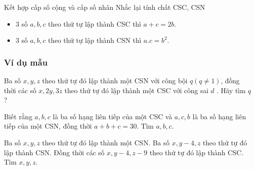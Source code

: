 \begin{dang}{Kết hợp cấp số cộng và cấp số nhân}
	Nhắc lại tính chất CSC, CSN
	\begin{itemize}
		\item $3$ số $a,b,c$ theo thứ tự lập thành CSC thì $a+c=2b$.
		\item $3$ số $a,b,c$ theo thứ tự lập thành CSN thì $a.c=b^2$.
	\end{itemize}
\end{dang}
\subsubsection{Ví dụ mẫu}
\begin{vd}[TH]%
	Ba số $x, y, z$ theo thứ tự đó lập thành một CSN với công bội $q (q\ne 1)$, đồng thời các số $x, 2y, 3z$ theo thứ tự đó lập thành một CSC với công sai $d$ . Hãy tìm $q$?
\end{vd}

\begin{vd}[TH]%
	Biết rằng $a, b, c$ là ba số hạng liên tiếp của một CSC và $a, c, b$ là ba số hạng liên tiếp của một CSN, đồng thời $a+b+c=30$. Tìm $a,b,c$.
\end{vd}

\begin{vd}[VD]%
	Ba số $x, y, z$ theo thứ tự đó lập thành một CSN. Ba số $x, y-4 , z$ theo thứ tự đó lập thành CSN. Đồng thời các số $x, y-4 , z-9$ theo thứ tự đó lập thành CSC. Tìm $x,y,z$.
	
\end{vd}

